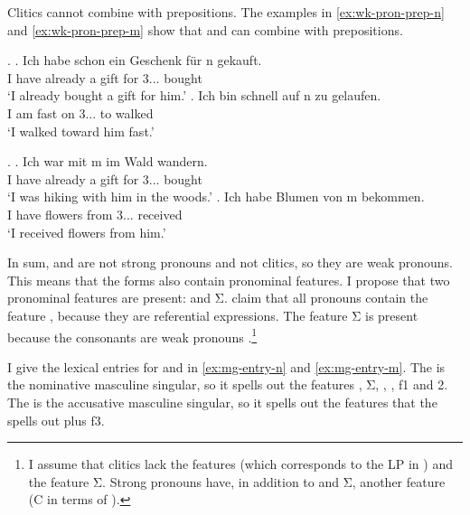 Clitics cannot combine with prepositions.
The examples in \ref{ex:wk-pron-prep-n} and \ref{ex:wk-pron-prep-m} show that  and  can combine with prepositions.

\ex.\label{ex:wk-pron-prep-n}
\ag. Ich habe schon ein Geschenk für n gekauft.\\
 I have already a gift for 3... bought\\
 `I already bought a gift for him.'
\bg. Ich bin schnell auf n zu gelaufen.\\
 I am fast on 3... to walked\\
 `I walked toward him fast.'

\ex.\label{ex:wk-pron-prep-m}
\ag. Ich war mit m im Wald wandern.\\
 I have already a gift for 3... bought\\
 `I was hiking with him in the woods.'
\bg. Ich habe Blumen von m bekommen.\\
 I have flowers from 3... received\\
 `I received flowers from him.'

In sum,  and  are not strong pronouns and not clitics, so they are weak pronouns.
This means that the forms also contain pronominal features.
I propose that two pronominal features are present:  and Σ.
\citet{harley2002} claim that all pronouns contain the feature , because they are referential expressions. The feature Σ is present because the consonants are weak pronouns \citep{cardinaletti1994}.\footnote{
I assume that clitics lack the features  (which corresponds to the LP in ) and the feature Σ. Strong pronouns have, in addition to  and Σ, another feature (C in terms of ).
}

I give the lexical entries for  and  in \ref{ex:mg-entry-n} and \ref{ex:mg-entry-m}.
The  is the nominative masculine singular, so it spells out the features , Σ, , ,  \ac{f}1 and 2. The  is the accusative masculine singular, so it spells out the features that the  spells out plus \ac{f}3.

